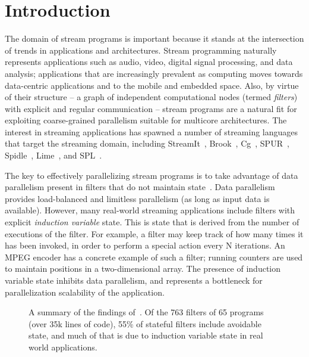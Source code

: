 \section{Introduction}

The domain of stream programs is important because it stands at the
intersection of trends in applications and architectures.  Stream
programming naturally represents applications such as audio, video,
digital signal processing, and data analysis; applications that are
increasingly prevalent as computing moves towards data-centric
applications and to the mobile and embedded space.  Also, by virtue of
their structure -- a graph of independent computational nodes (termed
{\it filters}) with explicit and regular communication -- stream
programs are a natural fit for exploiting coarse-grained parallelism
suitable for multicore architectures.  The interest in streaming
applications has spawned a number of streaming languages that target
the streaming domain, including StreamIt~\cite{streamitcc},
Brook~\cite{brook04}, Cg~\cite{cg03},
SPUR~\cite{spur05samos}, Spidle~\cite{spidle03}, Lime~\cite{lime10},
and SPL~\cite{spl09}.

The key to effectively parallelizing stream programs is to take
advantage of data parallelism present in filters that do not maintain
state~\cite{gordon-asplos06}.  Data parallelism provides load-balanced
and limitless parallelism (as long as input data is
available). However, many real-world streaming applications include
filters with explicit {\it induction variable} state. This is state
that is derived from the number of executions of the filter. For
example, a filter may keep track of how many times it has been
invoked, in order to perform a special action every N iterations. An
MPEG encoder has a concrete example of such a filter; running counters
are used to maintain positions in a two-dimensional array.  The
presence of induction variable state inhibits data parallelism, and
represents a bottleneck for parallelization scalability of the
application.

\begin{figure}[t!]
\centering
\caption{A summary of the findings of~\cite{streamit-suite}.  Of the
  763 filters of 65 programs (over 35k lines of code), 55\% of
  stateful filters include avoidable state, and much of that is due to
  induction variable state in real world
  applications.\protect\label{fig:state}}
\end{figure}

